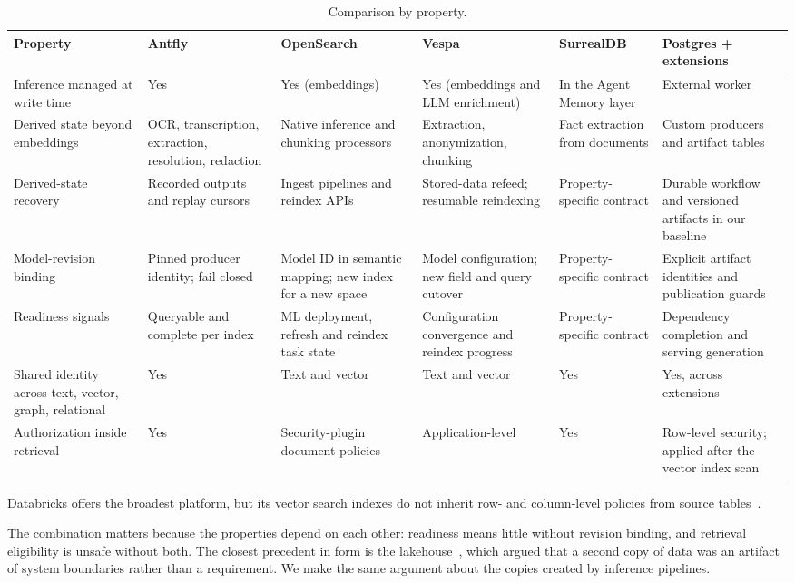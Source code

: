 \documentclass[sigconf,nonacm]{acmart}
\begin{document}
\begin{table}[t]
  \caption{Comparison by property.}
  \label{tab:comparison}
  \small
  \begin{tabularx}{\textwidth}{@{}p{}LLLLL@{}}
    \toprule
    Property & Antfly & OpenSearch & Vespa & SurrealDB & Postgres + extensions \\
    \midrule
    Inference managed at write time & Yes & Yes (embeddings) & Yes (embeddings and LLM enrichment) & In the Agent Memory layer & External worker \\
    Derived state beyond embeddings & OCR, transcription, extraction, resolution, redaction & Native inference and chunking processors & Extraction, anonymization, chunking & Fact extraction from documents & Custom producers and artifact tables \\
    Derived-state recovery & Recorded outputs and replay cursors & Ingest pipelines and reindex APIs & Stored-data refeed; resumable reindexing & Property-specific contract & Durable workflow and versioned artifacts in our baseline \\
    Model-revision binding & Pinned producer identity; fail closed & Model ID in semantic mapping; new index for a new space & Model configuration; new field and query cutover & Property-specific contract & Explicit artifact identities and publication guards \\
    Readiness signals & Queryable and complete per index & ML deployment, refresh and reindex task state & Configuration convergence and reindex progress & Property-specific contract & Dependency completion and serving generation \\
    Shared identity across text, vector, graph, relational & Yes & Text and vector & Text and vector & Yes & Yes, across extensions \\
    Authorization inside retrieval & Yes & Security-plugin document policies~\cite{opensearch-dls} & Application-level & Yes & Row-level security; applied after the vector index scan~\cite{pgvector,postgres-rls} \\
    \bottomrule
  \end{tabularx}
\end{table}

Databricks offers the broadest platform, but its vector search indexes do not
inherit row- and column-level policies from source
tables~\cite{databricks-vector-search}.

The combination matters because the properties depend on each other:
readiness means little without revision binding, and retrieval eligibility
is unsafe without both. The closest precedent in form is the
lakehouse~\cite{armbrust2021lakehouse}, which argued that a second copy of
data was an artifact of system boundaries rather than a requirement. We make
the same argument about the copies created by inference pipelines.
\end{document}
